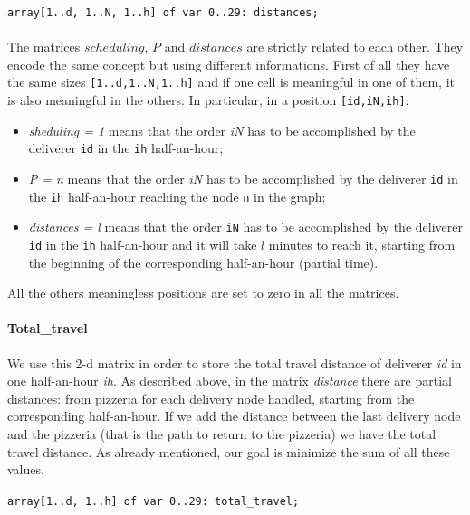 \documentclass[10pt]{article}
\begin{document}
	\begin{center}
		\texttt{array[1..d, 1..N, 1..h] of var 0..29: distances;}
	\end{center}

	\paragraph*{}
	The matrices $scheduling$, $P$ and $distances$ are strictly related to each other.
	They encode the same concept but using different informations. First of
	all they have the same sizes \texttt{[1..d,1..N,1..h]} and if one cell is meaningful in
	one	of them, it is also meaningful in the others.
	In particular, in a position 
	\texttt{[id,iN,ih]}:
	\begin{itemize}
		\item \textit{sheduling = 1} means that the order \textit{iN} has to be
		accomplished by the deliverer \texttt{id} in the \texttt{ih} half-an-hour;
		\item \textit{P = n} means that the order \textit{iN} has to be
		accomplished by the deliverer \texttt{id} in the \texttt{ih} half-an-hour 
		reaching the node \texttt{n} in the graph;
		\item \textit{distances = l} means that the order \texttt{iN} has to be
		accomplished by the deliverer \texttt{id} in the \texttt{ih} half-an-hour 
		and it will take $l$ minutes to reach it, starting from the beginning of the
		corresponding half-an-hour (partial time).
		 
	\end{itemize}
	All the others meaningless positions are set to zero in all the matrices.

	\paragraph*{Total\_travel}
	We use this 2-d matrix in order to store the total travel distance of deliverer \textit{id} in one half-an-hour \textit{ih}.
	As described above, in the matrix \textit{distance} there are partial distances: from pizzeria for each delivery node handled,
	starting from the corresponding half-an-hour.
	If we add the distance between the last delivery node and the pizzeria (that is the path to return to the pizzeria)
	we have the total travel distance.
	As already mentioned, our goal is minimize the sum of all these values.

	\begin{center}
		\texttt{array[1..d, 1..h] of var 0..29: total\_travel;}
	\end{center}
\end{document}
